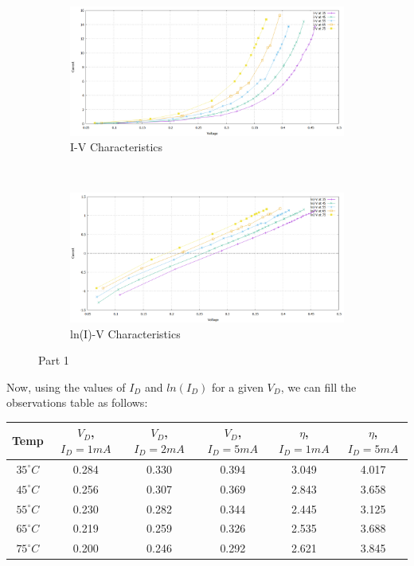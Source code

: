 \documentclass[12pt]{article}
\begin{document}
\begin{figure}[H]
	\begin{subfigure}[b]{\linewidth}
	   	\includegraphics[width = \linewidth, trim = {0 0 0 0}, clip]{Part1_IV.png}
		\caption{I-V Characteristics}
	\end{subfigure}\\
	\begin{subfigure}[b]{\linewidth}
		\includegraphics[width = \linewidth, trim = {0 0 0 0}, clip]{Part1_lnIV.png}
		\caption{ln(I)-V Characteristics}
	\end{subfigure} 
	\caption{Part 1}
\end{figure}

Now, using the values of \(I_D\) and \(ln(I_D)\) for a given \(V_D\), we can fill the observations table as follows:

\begin{center}
 \begin{tabular}{|| c | c | c | c | c | c ||} 
 \hline
 \hline
 Temp & \(V_D\), \(I_D = 1mA\) & \(V_D\), \(I_D = 2mA\) & \(V_D\), \(I_D = 5mA\) & \( \eta \), \(I_D = 1mA\) & \( \eta \), \( I_D = 5mA \) \\[0.25ex] 
 \hline\hline
 \(35^{\circ}C\) & 0.284 & 0.330 & 0.394 & 3.049 & 4.017 \\
 \(45^{\circ}C\) & 0.256 & 0.307 & 0.369 & 2.843 & 3.658 \\
 \(55^{\circ}C\) & 0.230 & 0.282 & 0.344 & 2.445 & 3.125 \\
 \(65^{\circ}C\) & 0.219 & 0.259 & 0.326 & 2.535 & 3.688 \\
 \(75^{\circ}C\) & 0.200 & 0.246 & 0.292 & 2.621 & 3.845 \\
 \hline 
\end{tabular}
\end{center}
\end{document}

